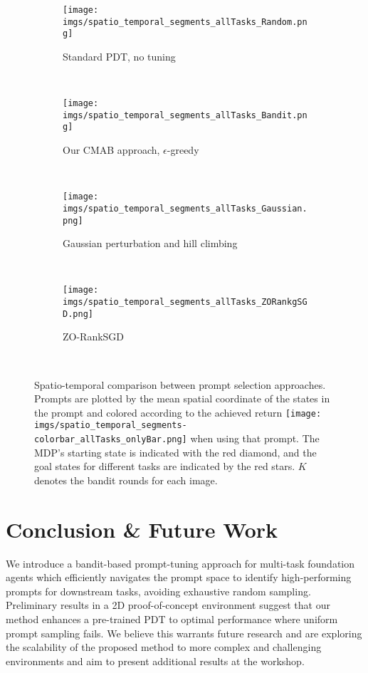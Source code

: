 \documentclass{article}
\begin{document}
\begin{figure*}[t!]
    \centering
    \begin{subfigure}[t]{0.45\textwidth}
        \centering
        \texttt{[image: imgs/spatio\_temporal\_segments\_allTasks\_Random.png]}
        \caption{Standard PDT, no tuning}\label{subfig:spatio-random}
    \end{subfigure}
    ~
    \begin{subfigure}[t]{0.45\textwidth}
        \centering
        \texttt{[image: imgs/spatio\_temporal\_segments\_allTasks\_Bandit.png]}
        \caption{Our CMAB approach, $\epsilon$-greedy}\label{subfig:spatio-bandit}
    \end{subfigure}
    ~
    \begin{subfigure}[t]{0.45\textwidth}
        \centering
        \texttt{[image: imgs/spatio\_temporal\_segments\_allTasks\_Gaussian.png]}
        \caption{Gaussian perturbation and hill climbing}\label{subfig:spatio-gaussian}
    \end{subfigure}
    ~
    \begin{subfigure}[t]{0.45\textwidth}
        \centering
        \texttt{[image: imgs/spatio\_temporal\_segments\_allTasks\_ZORankgSGD.png]}
        \caption{ZO-RankSGD \citep{xu2022prompting}}\label{subfig:spatio-zoranksgd}
    \end{subfigure}
    ~
    \caption{Spatio-temporal comparison between prompt selection approaches. Prompts are plotted by the mean spatial coordinate of the states in the prompt and colored according to the achieved return \texttt{[image: imgs/spatio\_temporal\_segments-colorbar\_allTasks\_onlyBar.png]} when using that prompt. The MDP's starting state is indicated with the red diamond, and the goal states for different tasks are indicated by the red stars. $K$ denotes the bandit rounds for each image.}\label{fig:spatio-bandit-gaussian}
\end{figure*}


\section{Conclusion \& Future Work}
We introduce a bandit-based prompt-tuning approach for multi-task foundation agents which efficiently navigates the prompt space to identify high-performing prompts for downstream tasks, avoiding exhaustive random sampling.
Preliminary results in a 2D proof-of-concept environment suggest that our method enhances a pre-trained PDT to optimal performance where uniform prompt sampling fails.
We believe this warrants future research and are exploring the scalability of the proposed method to more complex and challenging environments and aim to present additional results at the workshop.
\end{document}
